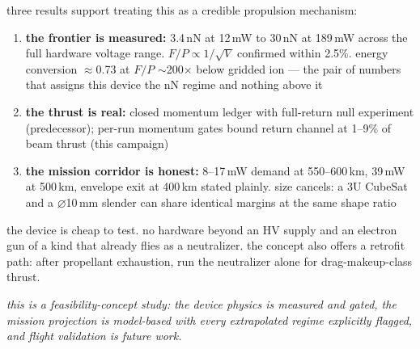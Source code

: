 \documentclass[11pt]{article}
\begin{document}
three results support treating this as a credible propulsion mechanism:

\begin{enumerate}
  \item \textbf{the frontier is measured:} 3.4\,nN at 12\,mW to 30\,nN at
        189\,mW across the full hardware voltage range.
        $F/P \propto 1/\sqrt{V}$ confirmed within 2.5\%.  energy conversion
        $\approx$0.73 at $F/P$ $\sim$200$\times$ below gridded ion --- the
        pair of numbers that assigns this device the nN regime and nothing
        above it
  \item \textbf{the thrust is real:} closed momentum ledger with full-return
        null experiment (predecessor); per-run momentum gates bound return
        channel at 1--9\% of beam thrust (this campaign)
  \item \textbf{the mission corridor is honest:} 8--17\,mW demand at
        550--600\,km, 39\,mW at 500\,km, envelope exit at 400\,km stated
        plainly.  size cancels: a 3U CubeSat and a $\varnothing$10\,mm slender
        can share identical margins at the same shape ratio
\end{enumerate}

\medskip
the device is cheap to test.  no hardware beyond an HV supply and an electron
gun of a kind that already flies as a neutralizer.  the concept also offers a
retrofit path: after propellant exhaustion, run the neutralizer alone for
drag-makeup-class thrust.

\medskip
{\itshape this is a feasibility-concept study: the device physics is measured
and gated, the mission projection is model-based with every extrapolated
regime explicitly flagged, and flight validation is future work.}
\end{document}
